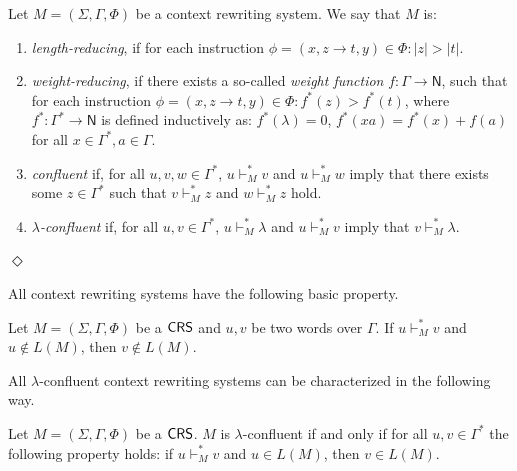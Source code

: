\begin{definition}\label{definition:crs-types}
Let  $M = (\Sigma, \Gamma, \Phi)$ be a context rewriting system. We say that $M$ is:
\begin{enumerate}
\item \emph{length-reducing}, if for each instruction $\phi = (x, z \to t, y) \in \Phi: |z| > |t|$.

\item \emph{weight-reducing}, if there exists a so-called \emph{weight function} $f: \Gamma \to \mathsf{N}$, such that for each instruction $\phi = (x, z \to t, y) \in \Phi: f^*(z) > f^*(t)$, where $f^*: \Gamma^* \to \mathsf{N}$ is defined inductively as: $f^*(\lambda) = 0$, $f^*(xa) = f^*(x) + f(a)$ for all $x \in \Gamma^*, a \in \Gamma$.

\item \emph{confluent} if, for all $u, v, w \in \Gamma^*$, $u \vdash_M^* v$ and $u \vdash_M^* w$ imply that there exists some $z \in \Gamma^*$ such that $v \vdash_M^* z$ and $w \vdash_M^* z$ hold.

\item \emph{$\lambda$-confluent} if, for all $u, v \in \Gamma^*$, $u \vdash_M^* \lambda$ and $u \vdash_M^* v$ imply that $v \vdash_M^* \lambda$.

\end{enumerate}
\hfill$\Diamond$
\end{definition}

All context rewriting systems have the following basic property.

\begin{lemma}\label{lemma:error-preserving}
Let $M=(\Sigma, \Gamma, \Phi)$ be a $\mbox{\sf CRS\/}$ and $u, v$ be two words over $\Gamma$. 
If $u \vdash_M^* v$ and $u \not\in L(M)$, then $v \not\in L(M)$.
\end{lemma}

All $\lambda$-confluent context rewriting systems can be characterized in the following way.

\begin{lemma}\label{lemma:correctness-preserving}
Let $M=(\Sigma, \Gamma, \Phi)$ be a $\mbox{\sf CRS\/}$. $M$ is $\lambda$-confluent if and only if for all $u, v \in \Gamma^*$ the following property holds: if $u \vdash_M^* v$ and $u \in L(M)$, then $v \in L(M)$.
\end{lemma}


